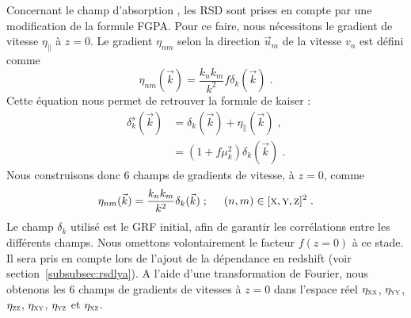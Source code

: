 \documentclass[11pt, twoside, a4paper, openright]{report}
\begin{document}
Concernant le champ d'absorption \lya{}, les RSD sont prises en compte par une modification de la formule FGPA. Pour ce faire, nous nécessitons le gradient de vitesse $\eta_{\parallel}$ à $z=0$. Le gradient $\eta_{nm}$ selon la direction $\vec u_m$ de la vitesse $v_n$ est défini comme
\begin{equation}
  \label{eq:eta1}
  \eta_{nm}(\vec k) = \frac{k_n k_m}{k^2} f \delta_k(\vec k) \; .
\end{equation}
Cette équation nous permet de retrouver la formule de kaiser :
\begin{align}
  \label{eq:kaiser5}
  \delta_k^s(\vec k) &= \delta_k(\vec k) + \eta_{\parallel}(\vec k) \; ,   \\
                     &= (1 + f \mu_k^2) \delta_k(\vec k)  \; .  \nonumber
\end{align}
Nous construisons donc 6 champs de gradients de vitesse, à $z=0$, comme
\begin{equation}
  \label{eq:eta2}
  \eta_{nm}(\vec k) = \frac{k_n k_m}{k^2} \delta_k(\vec k) \; ; \hspace{0.5cm} (n,m) \in [\textsc{x}, \textsc{y}, \textsc{z}]^2 \; .
\end{equation}
Le champ $\delta_k$ utilisé est le GRF initial, afin de garantir les corrélations entre les différents champs. Nous omettons volontairement le facteur $f(z=0)$ à ce stade. Il sera pris en compte lors de l'ajout de la dépendance en redshift (voir section~\ref{subsubsec:rsdlya}). A l'aide d'une transformation de Fourier, nous obtenons les 6 champs de gradients de vitesses  à $z = 0$ dans l'espace réel $\eta_{\textsc{xx}}$, $\eta_{\textsc{yy}}$, $\eta_{\textsc{zz}}$, $\eta_{\textsc{xy}}$, $\eta_{\textsc{yz}}$ et $\eta_{\textsc{xz}}$.




\end{document}
